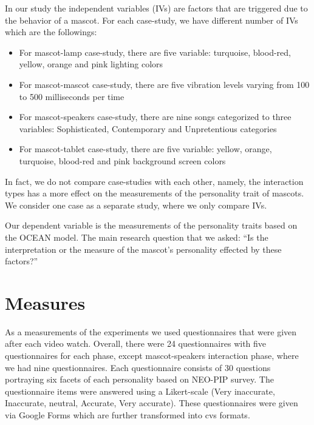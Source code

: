 In our study the independent variables (IVs) are factors that are triggered due to the behavior of a mascot.
For each case-study, we have different number of IVs which are the followings:
\begin{itemize}
  \item For mascot-lamp case-study, there are five variable: turquoise, blood-red, yellow, orange and pink lighting colors
  \item For mascot-mascot case-study, there are five vibration levels varying from 100 to 500 milliseconds per time
  \item For mascot-speakers case-study, there are nine songs categorized to three variables:
        Sophisticated, Contemporary and Unpretentious categories
   \item For mascot-tablet case-study, there are five variable: yellow, orange, turquoise,
        blood-red and pink background screen colors
\end{itemize}

In fact, we do not compare case-studies with each other, namely, the interaction types
has a more effect on the measurements of the personality trait of mascots.
We consider one case as a separate study, where we only compare IVs.
\par Our dependent variable is the measurements of the personality traits based on the OCEAN model.
The main research question that we asked: “Is the interpretation or the measure
of the mascot’s personality effected by these factors?”

\section{Measures}
\label{sec:measures}
As a measurements of the experiments we used questionnaires that were given after each video watch.
Overall, there were 24 questionnaires with five questionnaires for each phase, except
mascot-speakers interaction phase, where we had nine questionnaires.
Each questionnaire consists of 30 questions portraying six facets of each personality based on NEO-PIP survey.
The questionnaire items were answered using a Likert-scale
(Very inaccurate, Inaccurate, neutral, Accurate, Very accurate).
These questionnaires were given via Google Forms which are further transformed into cvs formats.



